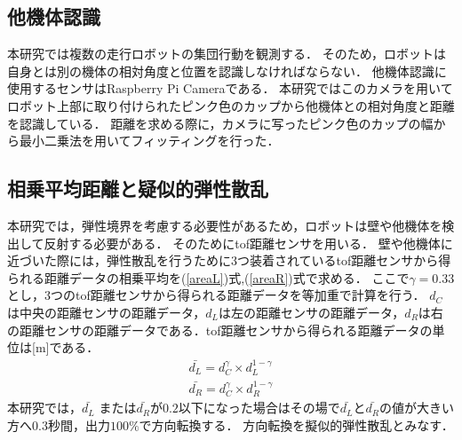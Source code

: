 \documentclass[twocolumn,dvipdfmx]{jarticle}
\begin{document}
\vspace{-3.5mm}
\subsection{他機体認識}
本研究では複数の走行ロボットの集団行動を観測する．
そのため，ロボットは自身とは別の機体の相対角度と位置を認識しなければならない．
他機体認識に使用するセンサはRaspberry Pi Cameraである．
本研究ではこのカメラを用いてロボット上部に取り付けられたピンク色のカップから他機体との相対角度と距離を認識している．
距離を求める際に，カメラに写ったピンク色のカップの幅から最小二乗法を用いてフィッティングを行った．
\vspace{-1.5mm}
\subsection{相乗平均距離と疑似的弾性散乱}
本研究では，弾性境界を考慮する必要性があるため，ロボットは壁や他機体を検出して反射する必要がある．
そのためにtof距離センサを用いる．
壁や他機体に近づいた際には，弾性散乱を行うために3つ装着されているtof距離センサから得られる距離データの相乗平均を(\ref{areaL})式,(\ref{areaR})式で求める．
ここで$ \gamma = 0.33 $とし，3つのtof距離センサから得られる距離データを等加重で計算を行う．
$d_{C} $は中央の距離センサの距離データ，$d_{L} $は左の距離センサの距離データ，$d_{R} $は右の距離センサの距離データである．tof距離センサから得られる距離データの単位は[m]である．
\begin{eqnarray}
\label{areaL}
\bar{d_{L}} = d_{C}^{\gamma} \times d_{L}^{1 - \gamma} \\
\bar{d_{R}} = d_{C}^{\gamma} \times d_{R}^{1 - \gamma}
\label{areaR}
\end{eqnarray}
本研究では，$\bar{d_{L}}$ または$\bar{d_{R}}$が$0.2$以下になった場合はその場で$\bar{d_{L}}$と$\bar{d_{R}}$の値が大きい方へ$0.3$秒間，出力$100\%$で方向転換する．
方向転換を擬似的弾性散乱とみなす．
\vspace{-1.8mm}
\end{document}
